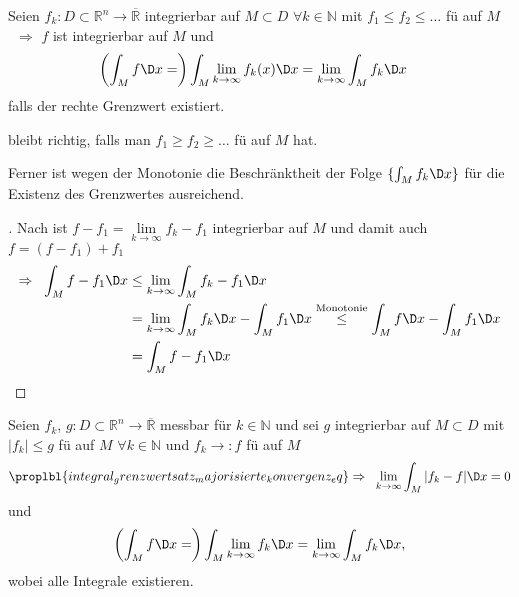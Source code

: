\begin{theorem}
	Seien $f_k:D\subset\mathbb{R}^n\to\overline{\mathbb{R}}$ integrierbar auf $M\subset D$ $\forall k\in\mathbb{N}$ mit $f_1 \le f_2 \le \dotsc $ \gls{fü} auf $M$ \\
	\ $\Rightarrow$ $f$ ist integrierbar auf $M$ und \begin{align*}
		\left( \int_M f \D x = \right) \int_M \lim\limits_{k\to\infty} f_k(x) \D x &= \lim\limits_{k\to\infty} \int_M f_k \D x
	\end{align*}
	falls der rechte Grenzwert existiert.
\end{theorem}

\begin{remark}
	 bleibt richtig, falls man $f_1 \ge f_2 \ge \dotsc$ \gls{fü} auf $M$ hat.
	
	Ferner ist wegen der Monotonie die Beschränktheit der Folge $\{ \int_M f_k \D x \}$ für die Existenz des Grenzwertes ausreichend.
\end{remark}

\begin{proof}[]
	Nach  ist $f - f_1 = \lim\limits_{k\to\infty} f_k - f_1$ integrierbar auf $M$ und damit auch $f = (f - f_1) + f_1$
	\begin{align*}
	\Rightarrow\;\;\int_M f - f_1 \D x &\le \lim\limits_{k\to\infty} \int_M f_k - f_1 \D x\\
	&= \lim\limits_{k\to\infty} \int_M f_k \D x - \int_M f_1 \D x
	\overset{\text{Monotonie}}{\le} \int_M f \D x - \int_M f_1\D x\\
	&= \int_M f - f_1 \D x
	\end{align*}
\end{proof}

\begin{theorem}
	Seien $f_k$, $g:D\subset\mathbb{R}^n\to\overline{\mathbb{R}}$ messbar für $k\in\mathbb{N}$ und sei $g$ integrierbar auf $M\subset D$ mit $\vert f_k\vert \le g$ \gls{fü} auf $M$ $\forall k\in\mathbb{N}$ und $f_k\to:f$ \gls{fü} auf $M$
	\begin{align}
		\proplbl{integral_grenzwertsatz_majorisierte_konvergenz_eq}
		\Rightarrow\;\;\lim\limits_{k\to\infty} \int_M \vert f_k - f\vert \D x = 0
	\end{align}
	und \begin{align*}
		\left(\int_M f\D x = \right) \int_M \lim\limits_{k\to\infty} f_k \D x = \lim\limits_{k\to\infty} \int_M f_k \D x,
	\end{align*}
	wobei alle Integrale existieren.
\end{theorem}

